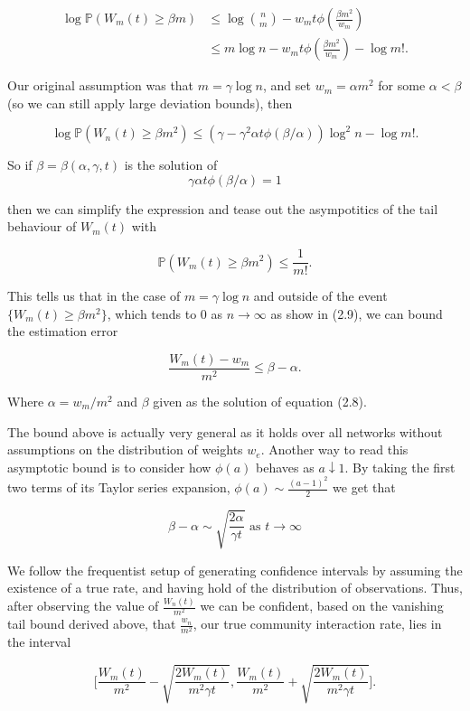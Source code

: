 \begin{equation}
\begin{split}
\log \mathbb{P}(W_m(t) \geq \beta m) & \leq \log {n \choose m} -w_mt\phi(\frac{\beta m^2}{w_m}) \\
& \leq m \log n - w_m t \phi(\frac{\beta m^2}{w_m}) - \log m!.
\end{split}
\end{equation}

Our original assumption was that $m = \gamma \log n$, and set $w_m = \alpha m^2$ for some $\alpha < \beta$ (so we can still apply large deviation bounds), then

\begin{equation}
\log \mathbb{P}(W_n(t) \geq \beta m^2) \leq (\gamma - \gamma^2 \alpha t \phi(\beta/\alpha))\log^2n-\log m!.
\end{equation}

So if $\beta = \beta(\alpha, \gamma, t)$ is the solution of 
\begin{equation}
\gamma \alpha t \phi(\beta/\alpha) = 1
\end{equation}

then we can simplify the expression and tease out the asympotitics of the tail behaviour of $W_m(t)$ with

\begin{equation}
\mathbb{P}(W_m(t) \geq \beta m^2) \leq \frac{1}{m!}.
\end{equation}

This tells us that in the case of $m = \gamma \log n$ and outside of the event $\{ W_m(t) \geq \beta m^2\}$, which tends to $0$ as $n \rightarrow \infty$ as show in (2.9), we can bound the estimation error

\begin{equation}
\frac{W_m(t)-w_m}{m^2} \leq \beta - \alpha.
\end{equation}

Where $\alpha = w_m/m^2$ and $\beta$ given as the solution of equation (2.8).

The bound above is actually very general as it holds over all networks without assumptions on the distribution of weights $w_e$.  Another way to read this asymptotic bound is to consider how $\phi(a)$ behaves as $a \downarrow 1$. By taking the first two terms of its Taylor series expansion, $\phi(a) \sim \frac{(a-1)^2}{2}$ we get that

\begin{equation}
\beta - \alpha \sim \sqrt{\frac{2\alpha}{\gamma t}} \text{    as } t \rightarrow \infty
\end{equation}

We follow the frequentist setup of generating confidence intervals by assuming the existence of a true rate, and having hold of the distribution of observations. Thus, after observing the value of $\frac{W_n(t)}{m^2}$ we can be confident, based on the vanishing tail bound derived above, that $\frac{w_n}{m^2}$, our true community interaction rate, lies in the interval 

\begin{equation}
\Bigg[\frac{W_m(t)}{m^2}-\sqrt{\frac{2W_m(t)}{m^2\gamma t}}, \frac{W_m(t)}{m^2}+\sqrt{\frac{2W_m(t)}{m^2\gamma t}}\Bigg].
\end{equation}
